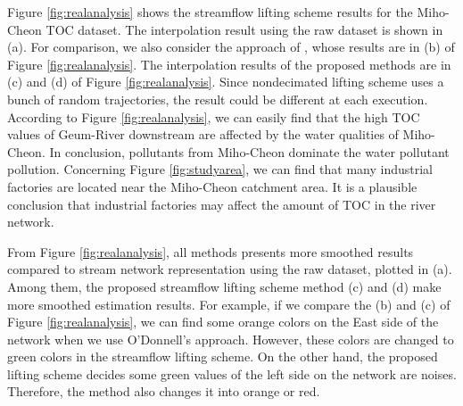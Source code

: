 \documentclass[11pt,titlepage]{article}
\begin{document}
Figure \ref{fig:realanalysis} shows the streamflow lifting scheme results for the Miho-Cheon TOC dataset. The interpolation result using the raw dataset is shown in (a). For comparison, we also consider the approach of \cite{ODonnell2014}, whose results are in (b) of Figure \ref{fig:realanalysis}. The interpolation results of the proposed methods are in (c) and (d) of Figure \ref{fig:realanalysis}. Since nondecimated lifting scheme uses a bunch of random trajectories, the result could be different at each execution.
According to Figure \ref{fig:realanalysis}, we can easily find that the high TOC values of Geum-River downstream are affected by the water qualities of Miho-Cheon. In conclusion, pollutants from Miho-Cheon dominate the water pollutant pollution. Concerning Figure \ref{fig:studyarea}, we can find that many industrial factories are located near the Miho-Cheon catchment area. It is a plausible conclusion that industrial factories may affect the amount of TOC in the river network.

From Figure \ref{fig:realanalysis}, all methods presents more smoothed results compared to stream network representation using the raw dataset, plotted in (a).
Among them, the proposed streamflow lifting scheme method (c) and (d) make more smoothed estimation results. %
For example, if we compare the (b) and (c) of Figure \ref{fig:realanalysis}, we can find some orange colors on the East side of the network when we use O'Donnell's approach. However, these colors are changed to green colors in the streamflow lifting scheme. On the other hand, the proposed lifting scheme decides some green values of the left side on the network are noises. Therefore, the method also changes it into orange or red.
\end{document}
